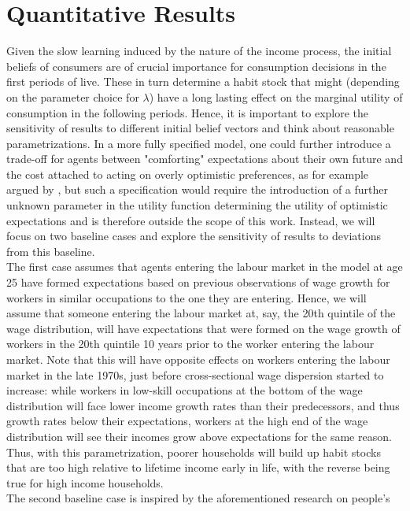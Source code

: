 \pagebreak
\section{Quantitative Results}\label{sec:qr}
Given the slow learning induced by the nature of the income process, the initial 
beliefs of consumers are of crucial importance for consumption decisions in the 
first periods of live. These in turn determine a habit stock that might (depending
 on the parameter choice for $\lambda$) have a long lasting effect on the marginal 
utility of consumption in the following periods. Hence, it is important to explore
 the sensitivity of results to different initial belief vectors and think about 
reasonable parametrizations. In a more fully specified model, one could further
 introduce a trade-off for agents between "comforting" expectations about their 
own future and the cost attached to acting on overly optimistic preferences, as 
for example argued by \citet{Glaeser2004}, but such a specification would require
 the introduction of a further unknown parameter in the utility function determining
 the utility of optimistic expectations and is therefore outside the scope of 
this work. Instead, we will focus on two baseline cases and explore the 
sensitivity of results to deviations from this baseline. \\
The first case assumes that agents entering the labour market in the model at age
 25 have formed expectations based on previous observations of wage growth for 
workers in similar occupations to the one they are entering. Hence, we will assume
 that someone entering the labour market at, say, the 20th quintile of the wage 
distribution, will have expectations that were formed on the wage growth of 
workers in the 20th quintile 10 years prior to the worker entering the labour 
market. Note that this will have opposite effects on workers entering the labour
 market in the late 1970s, just before cross-sectional wage dispersion started 
to increase: while workers in low-skill occupations at the bottom of the wage 
distribution will face lower income growth rates than their predecessors, and 
thus growth rates below their expectations, workers at the high end of the wage 
distribution will see their incomes grow above expectations for the same reason. 
Thus, with this parametrization, poorer households will build up habit stocks 
that are too high relative to lifetime income early in life, with the reverse 
being true for high income households. \\
The second baseline case is inspired by the aforementioned research on people's 
